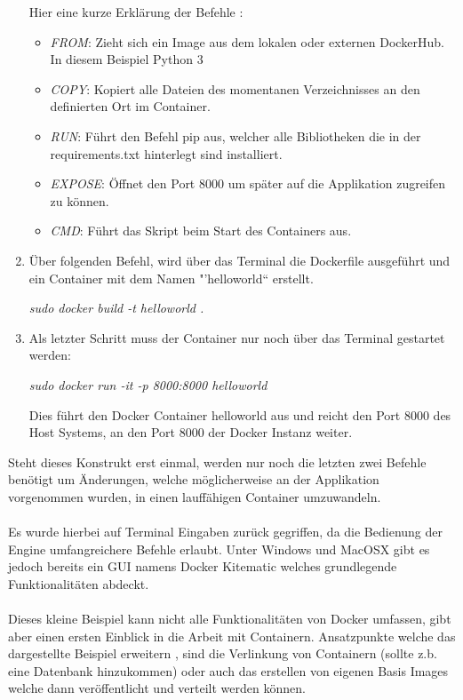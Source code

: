 \documentclass[12pt,toc=bib,toc=listof]{scrreprt}
\begin{document}
\begin{enumerate}[leftmargin=*]
Hier eine kurze Erklärung der Befehle :
\begin{itemize}
	\item \textit{FROM}: Zieht sich ein Image aus dem lokalen oder externen DockerHub. In diesem Beispiel Python 3
	\item \textit{COPY}: Kopiert alle Dateien des momentanen Verzeichnisses an den definierten Ort im Container.
	\item \textit{RUN}: Führt den Befehl pip aus, welcher alle Bibliotheken die in der requirements.txt hinterlegt sind installiert.
	\item \textit{EXPOSE}: Öffnet den Port 8000 um später auf die Applikation zugreifen zu können.
	\item \textit{CMD}: Führt das Skript beim Start des Containers aus.
\end{itemize}

\item Über folgenden Befehl, wird über das Terminal die Dockerfile ausgeführt und ein Container mit dem Namen "'helloworld“ erstellt.

\textit{sudo docker build -t helloworld .}

\item Als letzter Schritt muss der Container nur noch  über das Terminal gestartet werden:

\textit{sudo docker run -it -p 8000:8000 helloworld}

Dies führt den Docker Container helloworld aus und reicht den Port 8000 des Host Systems, an den Port 8000 der Docker Instanz weiter.\cite{django}
\end{enumerate}
Steht dieses Konstrukt erst einmal, werden nur noch die letzten zwei Befehle benötigt um Änderungen, welche möglicherweise an der Applikation vorgenommen wurden, in einen lauffähigen Container umzuwandeln.\\
\\
Es wurde hierbei auf Terminal Eingaben zurück gegriffen, da die Bedienung der Engine umfangreichere Befehle erlaubt. Unter Windows und MacOSX gibt es jedoch bereits ein GUI namens Docker Kitematic welches grundlegende Funktionalitäten abdeckt.\\
\\
Dieses kleine Beispiel kann nicht alle Funktionalitäten von Docker umfassen, gibt aber einen ersten Einblick in die Arbeit mit Containern.
Ansatzpunkte welche das dargestellte Beispiel erweitern , sind die Verlinkung von Containern (sollte z.b. eine Datenbank hinzukommen) oder auch das erstellen von eigenen Basis Images welche dann veröffentlicht und verteilt werden können.
\end{document}
